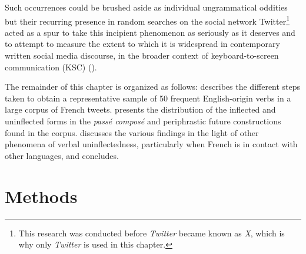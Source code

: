 \documentclass[output=paper]{langscibook}
\begin{document}
Such occurrences could be brushed aside as individual ungrammatical oddities but their recurring presence in random searches on the social network Twitter\footnote{This research was conducted before \textit{Twitter} became known as \textit{X}, which is why only \textit{Twitter} is used in this chapter.} acted as a spur to take this incipient phenomenon as seriously as it deserves and to attempt to measure the extent to which it is widespread in contemporary written social media discourse, in the broader context of keyboard-to-screen communication (KSC) (\citealt{JuckerDürscheid2012}).

The remainder of this chapter is organized as follows:  describes the different steps taken to obtain a representative sample of 50 frequent English-origin verbs in a large corpus of French tweets.  presents the distribution of the inflected and uninflected forms in the \textit{passé composé} and periphrastic future constructions found in the corpus.  discusses the various findings in the light of other phenomena of verbal uninflectedness, particularly when French is in contact with other languages, and concludes.

\section{Methods}
\end{document}
